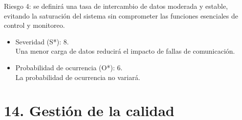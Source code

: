 \documentclass[
11pt, %
]{charter}
\begin{document}
Riesgo 4: se definirá una tasa de intercambio de datos moderada y estable, evitando la saturación del sistema sin comprometer las funciones esenciales de control y monitoreo.
 
  \begin{itemize}
	\item Severidad (S*): 8.\\
          Una menor carga de datos reducirá el impacto de fallas de comunicación.
	\item Probabilidad de ocurrencia (O*): 6.\\
          La probabilidad de ocurrencia no variará.
	\end{itemize}


\section{14. Gestión de la calidad}
\label{sec:calidad}
\end{document}
